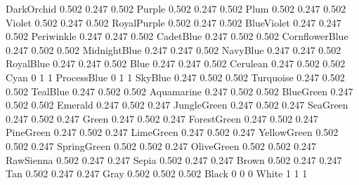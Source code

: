 \newColor DarkOrchid {0.502 0.247 0.502} %
\newColor Purple {0.502 0.247 0.502}    %
\newColor Plum {0.502 0.247 0.502}      %
\newColor Violet {0.502 0.247 0.502}     %
\newColor RoyalPurple {0.502 0.247 0.502} %
\newColor BlueViolet {0.247 0.247 0.502} %
\newColor Periwinkle {0.247 0.247 0.502} %
\newColor CadetBlue {0.247 0.502 0.502} %
\newColor CornflowerBlue {0.247 0.502 0.502} %
\newColor MidnightBlue {0.247 0.247 0.502} %
\newColor NavyBlue {0.247 0.247 0.502}  %
\newColor RoyalBlue {0.247 0.247 0.502} %
\newColor Blue {0.247 0.247 0.502}      %
\newColor Cerulean {0.247 0.502 0.502}   %
\newColor Cyan {0 1 1}                  %
\newColor ProcessBlue {0 1 1}           %
\newColor SkyBlue {0.247 0.502 0.502}   %
\newColor Turquoise {0.247 0.502 0.502}  %
\newColor TealBlue {0.247 0.502 0.502}  %
\newColor Aquamarine {0.247 0.502 0.502} %
\newColor BlueGreen {0.247 0.502 0.502} %
\newColor Emerald {0.247 0.502 0.247}   %
\newColor JungleGreen {0.247 0.502 0.247} %
\newColor SeaGreen {0.247 0.502 0.247}  %
\newColor Green {0.247 0.502 0.247}     %
\newColor ForestGreen {0.247 0.502 0.247} %
\newColor PineGreen {0.247 0.502 0.247}  %
\newColor LimeGreen {0.247 0.502 0.247}  %
\newColor YellowGreen {0.502 0.502 0.247} %
\newColor SpringGreen {0.502 0.502 0.247} %
\newColor OliveGreen {0.502 0.502 0.247}  %
\newColor RawSienna {0.502 0.247 0.247}   %
\newColor Sepia {0.502 0.247 0.247}       %
\newColor Brown {0.502 0.247 0.247}       %
\newColor Tan {0.502 0.247 0.247}         %
\newColor Gray {0.502 0.502 0.502}        %
\newColor Black {0 0 0}                   %
\newColor White {1 1 1}                   %
